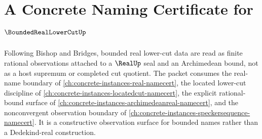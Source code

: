 \chapter{A Concrete Naming Certificate for $\BoundedRealLowerCutUp$}
\label{ch:concrete-instances-bounded-real-lower-cut-namecert}

Following Bishop and Bridges, bounded real lower-cut data are read as finite rational observations attached to a $\RealUp$ seal and an Archimedean bound, not as a host supremum or completed cut quotient. The packet consumes the real-name boundary of \autoref{ch:concrete-instances-real-namecert}, the located lower-cut discipline of \autoref{ch:concrete-instances-locatedcut-namecert}, the explicit rational-bound surface of \autoref{ch:concrete-instances-archimedeanreal-namecert}, and the nonconvergent observation boundary of \autoref{ch:concrete-instances-speckersequence-namecert}. It is a constructive observation surface for bounded names rather than a Dedekind-real construction.

